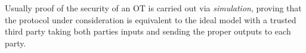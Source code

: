 \documentclass[a4paper,11pt]{article}
\begin{document}
				Usually proof of the security of an OT is carried out via \emph{simulation}, proving that the protocol under consideration is equivalent to the ideal model with a trusted third party taking both parties inputs and sending the proper outputs to each party.
% 
% 
% 
% 
% 
% 
% 
 
\end{document}
